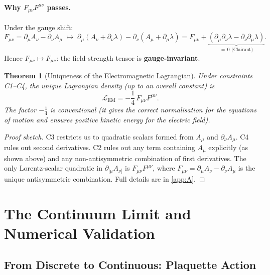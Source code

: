\documentclass[12pt, a4paper]{article}
\theoremstyle{plain}
\newtheorem{theorem}{Theorem}[section]
\theoremstyle{definition}
\theoremstyle{remark}
\newcommand{\Lag}{\mathcal{L}}
\begin{document}
\paragraph{Why $F_{\mu\nu}F^{\mu\nu}$ passes.}
Under the gauge shift:
\[
  F_{\mu\nu} = \partial_\mu A_\nu - \partial_\nu A_\mu
  \;\longmapsto\;
  \partial_\mu(A_\nu + \partial_\nu\lambda) - \partial_\nu(A_\mu + \partial_\mu\lambda)
  = F_{\mu\nu} + \underbrace{(\partial_\mu\partial_\nu\lambda - \partial_\nu\partial_\mu\lambda)}_{=\,0\text{ (Clairaut)}}.
\]
Hence $F_{\mu\nu} \mapsto F_{\mu\nu}$: the field-strength tensor is \textbf{gauge-invariant}. \checkmark

\begin{theorem}[Uniqueness of the Electromagnetic Lagrangian]
\label{thm:uniqueness}
Under constraints C1–C4, the unique Lagrangian density (up to an overall constant) is
\begin{equation}
  \boxed{\Lag_{\mathrm{EM}} = -\frac{1}{4}\,F_{\mu\nu}F^{\mu\nu}.}
  \label{eq:EM_lagrangian}
\end{equation}
The factor $-\tfrac{1}{4}$ is conventional (it gives the correct normalisation for the equations of motion and ensures positive kinetic energy for the electric field).
\end{theorem}

\begin{proof}[Proof sketch]
C3 restricts us to quadratic scalars formed from $A_\mu$ and $\partial_\nu A_\mu$.  C4 rules out second derivatives.  C2 rules out any term containing $A_\mu$ explicitly (as shown above) and any non-antisymmetric combination of first derivatives.  The only Lorentz-scalar quadratic in $\partial_{[\mu}A_{\nu]}$ is $F_{\mu\nu}F^{\mu\nu}$, where $F_{\mu\nu} = \partial_\mu A_\nu - \partial_\nu A_\mu$ is the unique antisymmetric combination.  Full details are in \cref{app:A}.
\end{proof}

\section{The Continuum Limit and Numerical Validation}
\label{sec:numerical}

\subsection{From Discrete to Continuous: Plaquette Action}
\end{document}

